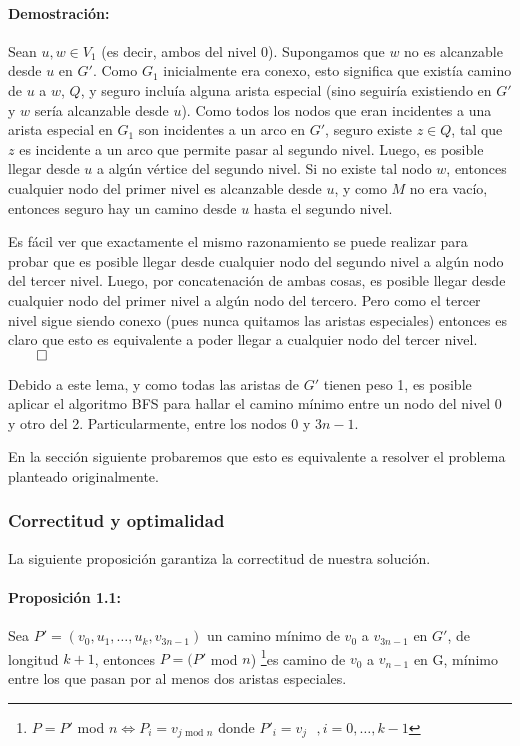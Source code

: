 \paragraph*{Demostración: }Sean $u,w\in V_1$ (es decir, ambos del nivel 0). Supongamos que $w$ no es alcanzable desde $u$ en $G'$. Como $G_1$ inicialmente era conexo, esto significa que existía camino de $u$ a $w$, $Q$, y seguro incluía alguna arista especial (sino seguiría existiendo en $G'$ y $w$ sería alcanzable desde $u$). Como todos los nodos que eran incidentes a una arista especial en $G_1$ son incidentes a un arco en $G'$, seguro existe $z\in Q$, tal que $z$ es incidente a un arco que permite pasar al segundo nivel. Luego, es posible llegar desde $u$ a algún vértice del segundo nivel. Si no existe tal nodo $w$, entonces cualquier nodo del primer nivel es alcanzable desde $u$, y como $M$ no era vacío, entonces seguro hay un camino desde $u$ hasta el segundo nivel.

Es fácil ver que exactamente el mismo razonamiento se puede realizar para probar que es posible llegar desde cualquier nodo del segundo nivel a algún nodo del tercer nivel. Luego, por concatenación de ambas cosas, es posible llegar desde cualquier nodo del primer nivel a algún nodo del tercero. Pero como el tercer nivel sigue siendo conexo (pues nunca quitamos las aristas especiales) entonces es claro que esto es equivalente a poder llegar a cualquier nodo del tercer nivel. $\qed$

Debido a este lema, y como todas las aristas de $G'$ tienen peso 1, es posible aplicar el algoritmo BFS para hallar el camino mínimo entre un nodo del nivel 0 y otro del 2. Particularmente, entre los nodos 0 y $3n-1$. 

En la sección siguiente probaremos que esto es equivalente a resolver el problema planteado originalmente.

\subsubsection{Correctitud y optimalidad}
La siguiente proposición garantiza la correctitud de nuestra solución.

\paragraph*{Proposición 1.1: }
Sea $P'=(v_0, u_1,\dots, u_{k}, v_{3n-1})$ un camino mínimo de $v_0$ a $v_{3n-1}$ en $G'$, de longitud $k+1$, entonces $P = (P'$ mod $n$) \footnote{$P = P'$ mod $n \Leftrightarrow P_i = v_{j\text{ mod }n}\text{ donde $P'_i=v_j$ }, i = 0,\dots, k-1$}es camino de $v_0$ a $v_{n-1}$ en G, mínimo entre los que pasan por al menos dos aristas especiales.

